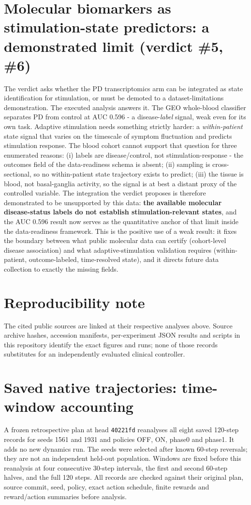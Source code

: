 \section{Molecular biomarkers as stimulation-state predictors: a demonstrated limit (verdict \#5, \#6)}
The verdict asks whether the PD transcriptomics arm can be integrated as state
identification for stimulation, or must be demoted to a dataset-limitations
demonstration. The executed analysis answers it. The GEO whole-blood classifier
separates PD from control at AUC 0.596 - a disease-\emph{label} signal, weak even for
its own task. Adaptive stimulation needs something strictly harder: a
\emph{within-patient} state signal that varies on the timescale of symptom fluctuation
and predicts stimulation response. The blood cohort cannot support that question for
three enumerated reasons: (i) labels are disease/control, not stimulation-response -
the outcomes field of the data-readiness schema is absent; (ii) sampling is cross-
sectional, so no within-patient state trajectory exists to predict; (iii) the tissue is
blood, not basal-ganglia activity, so the signal is at best a distant proxy of the
controlled variable. The integration the verdict proposes is therefore demonstrated to
be unsupported by this data: \textbf{the available molecular disease-status labels do not establish stimulation-relevant states}, and the AUC 0.596 result
now serves as the quantitative anchor of that limit inside the data-readiness
framework. This is the positive use of a weak result: it fixes the boundary between
what public molecular data can certify (cohort-level disease association) and what
adaptive-stimulation validation requires (within-patient, outcome-labeled, time-resolved
state), and it directs future data collection to exactly the missing fields.

\section{Reproducibility note}
The cited public sources are linked at their respective analyses above. Source archive hashes, accession manifests, per-experiment JSON results and scripts in this repository identify the exact figures and runs; none of those records substitutes for an independently evaluated clinical controller.




\section{Saved native trajectories: time-window accounting}
A frozen retrospective plan at head \texttt{40221fd} reanalyses all eight saved 120-step records for seeds 1561 and 1931 and policies OFF, ON, phase0 and phase1. It adds no new dynamics run. The seeds were selected after known 60-step reversals; they are not an independent held-out population. Windows are fixed before this reanalysis at four consecutive 30-step intervals, the first and second 60-step halves, and the full 120 steps. All records are checked against their original plan, source commit, seed, policy, exact action schedule, finite rewards and reward/action summaries before analysis.

